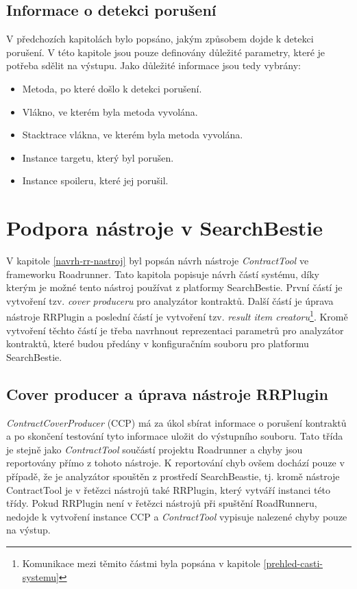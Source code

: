 \subsection{Informace o detekci porušení}

V předchozích kapitolách bylo popsáno, jakým způsobem dojde k detekci porušení. V této kapitole jsou pouze definovány důležité parametry, které je potřeba sdělit na výstupu. Jako důležité informace jsou tedy vybrány:
\begin{itemize}
\item{Metoda, po které došlo k detekci porušení.}
\item{Vlákno, ve kterém byla metoda vyvolána.}
\item{Stacktrace vlákna, ve kterém byla metoda vyvolána.}
\item{Instance targetu, který byl porušen.}
\item{Instance spoileru, které jej porušil.}
\end{itemize}

\section{Podpora nástroje v SearchBestie}
V kapitole \ref{navrh-rr-nastroj} byl popsán návrh nástroje \textit{ContractTool} ve frameworku Roadrunner. Tato kapitola popisuje návrh částí systému, díky kterým je možné tento nástroj používat z platformy SearchBestie. První částí je vytvoření tzv. \textit{cover produceru} pro analyzátor kontraktů. Další částí je úprava nástroje RRPlugin a poslední částí je vytvoření tzv. \textit{result item creatoru}\footnote{Komunikace mezi těmito částmi byla popsána v kapitole \ref{prehled-casti-systemu}}. Kromě vytvoření těchto částí je třeba navrhnout reprezentaci parametrů pro analyzátor kontraktů, které budou předány v konfiguračním souboru pro platformu SearchBestie.

\subsection{Cover producer a úprava nástroje RRPlugin}\label{cover-producer-rr}

\textit{ContractCoverProducer} (CCP) má za úkol sbírat informace o porušení kontraktů a po skončení testování tyto informace uložit do výstupního souboru. Tato třída je stejně jako \textit{ContractTool} součástí projektu Roadrunner a chyby jsou reportovány přímo z tohoto nástroje. K reportování chyb ovšem dochází pouze v případě, že je analyzátor spouštěn z prostředí SearchBeastie, tj. kromě nástroje ContractTool je v řetězci nástrojů také RRPlugin, který vytváří instanci této třídy. Pokud RRPlugin není v řetězci nástrojů při spuštění RoadRunneru, nedojde k vytvoření instance CCP a \textit{ContractTool} vypisuje nalezené chyby pouze na výstup.

